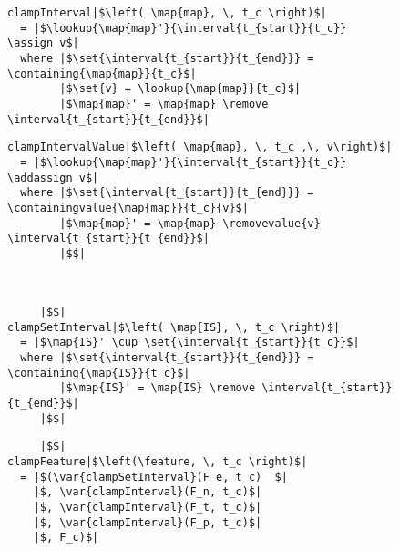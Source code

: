 \begin{figure}
\begin{minipage}[t]{0.5\textwidth}
  \begin{verbatim}
clampInterval|$\left( \map{map}, \, t_c \right)$|
  = |$\lookup{\map{map}'}{\interval{t_{start}}{t_c}} \assign v$|
  where |$\set{\interval{t_{start}}{t_{end}}} = \containing{\map{map}}{t_c}$|
        |$\set{v} = \lookup{\map{map}}{t_c}$|
        |$\map{map}' = \map{map} \remove \interval{t_{start}}{t_{end}}$|
  \end{verbatim}
  \label{fun:clamp-interval}
\end{minipage}
\begin{minipage}[t]{0.5\textwidth}
  \begin{verbatim}
clampIntervalValue|$\left( \map{map}, \, t_c ,\, v\right)$|
  = |$\lookup{\map{map}'}{\interval{t_{start}}{t_c}} \addassign v$|
  where |$\set{\interval{t_{start}}{t_{end}}} = \containingvalue{\map{map}}{t_c}{v}$|
        |$\map{map}' = \map{map} \removevalue{v} \interval{t_{start}}{t_{end}}$|
        |$$|
  \end{verbatim}
  \label{fun:clamp-interval-value}
\end{minipage}
\\

\begin{minipage}[t]{0.5\textwidth}
  \begin{verbatim}
     |$$|
clampSetInterval|$\left( \map{IS}, \, t_c \right)$|
  = |$\map{IS}' \cup \set{\interval{t_{start}}{t_c}}$|
  where |$\set{\interval{t_{start}}{t_{end}}} = \containing{\map{IS}}{t_c}$|
        |$\map{IS}' = \map{IS} \remove \interval{t_{start}}{t_{end}}$|
     |$$|
  \end{verbatim}
  \label{fun:clamp-set-interval}
\end{minipage}
\begin{minipage}[t]{0.5\textwidth}
  \begin{verbatim}
     |$$|
clampFeature|$\left(\feature, \, t_c \right)$|
  = |$(\var{clampSetInterval}(F_e, t_c)  $|
    |$, \var{clampInterval}(F_n, t_c)$|
    |$, \var{clampInterval}(F_t, t_c)$|
    |$, \var{clampInterval}(F_p, t_c)$|
    |$, F_c)$|
  \end{verbatim}
  \label{fun:clamp-feature}
\end{minipage}


\end{figure}
